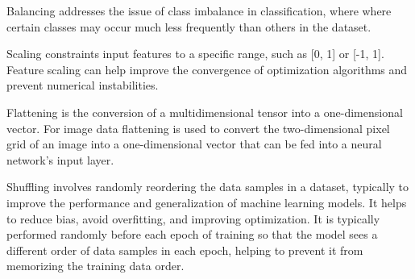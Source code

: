 \documentclass[a4paper]{article}
\begin{document}
\begin{description}
Balancing addresses the issue of class imbalance in classification, where where certain classes may occur much less frequently than others in the dataset. 

Scaling constraints input features to a specific range, such as [0, 1] or [-1, 1]. Feature scaling can help improve the convergence of optimization algorithms and prevent numerical instabilities.

Flattening is the conversion of a multidimensional tensor into a one-dimensional vector. For image data flattening is used to convert the two-dimensional pixel grid of an image into a one-dimensional vector that can be fed into a neural network's input layer.

Shuffling involves randomly reordering the data samples in a dataset, typically to improve the performance and generalization of machine learning models. It helps to reduce bias, avoid overfitting, and improving optimization. It is typically performed randomly before each epoch of training so that the model sees a different order of data samples in each epoch, helping to prevent it from memorizing the training data order.
\end{description}
\end{document}
